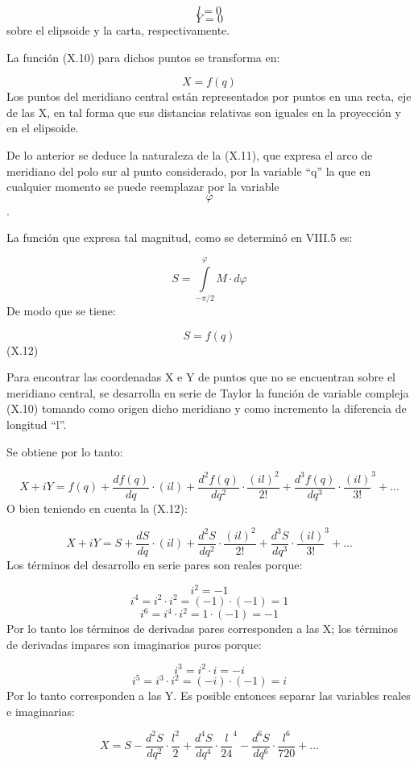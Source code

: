 \documentclass[]{article}
\begin{document}
\[l=0\] \[Y=0\] sobre el elipsoide y la carta, respectivamente.

La función (X.10) para dichos puntos se transforma en:

\[X=f\left(q\right)\] Los puntos del meridiano central están
representados por puntos en una recta, eje de las X, en tal forma que
sus distancias relativas son iguales en la proyección y en el elipsoide.

De lo anterior se deduce la naturaleza de la (X.11), que expresa el arco
de meridiano del polo sur al punto considerado, por la variable ``q'' la
que en cualquier momento se puede reemplazar por la variable
\[\varphi \].

La función que expresa tal magnitud, como se determinó en VIII.5 es:

\[S=\overset{{\varphi }}{\underset{{-\pi /2}}{\int }}{M\cdot
d\varphi }\] De modo que se tiene:

\[S=f\left(q\right)\] (X.12)

Para encontrar las coordenadas X e Y de puntos que no se encuentran
sobre el meridiano central, se desarrolla en serie de Taylor la función
de variable compleja (X.10) tomando como origen dicho meridiano y como
incremento la diferencia de longitud ``l''.

Se obtiene por lo tanto:

\[X+iY=f\left(q\right)+\frac{df\left(q\right)}{dq}\cdot
\left(il\right)+\frac{d^2f\left(q\right)}{dq^2}\cdot
{\frac{\left(il\right)^2}{2!}}+\frac{d^3f\left(q\right)}{dq^3}\cdot
{\frac{\left(il\right)}{3!}}^3+\text{.}\text{.}\text{.}\] O bien
teniendo en cuenta la (X.12):

\[X+iY=S+\frac{dS}{dq}\cdot
\left(il\right)+\frac{d^2S}{dq^2}\cdot
{\frac{\left(il\right)^2}{2!}}+\frac{d^3S}{dq^3}\cdot
{\frac{\left(il\right)}{3!}}^3+\text{.}\text{.}\text{.}\] Los términos
del desarrollo en serie pares son reales porque:

\[i^2=-1\] \[i^4=i^2\cdot i^2=\left(-1\right)\cdot \left(-1\right)=1\]
\[i^6=i^4\cdot i^2=1\cdot \left(-1\right)=-1\] Por lo tanto los términos
de derivadas pares corresponden a las X; los términos de derivadas
impares son imaginarios puros porque:

\[i^3=i^2\cdot i=-i\]
\[i^5=i^3\cdot i^2=\left(-i\right)\cdot \left(-1\right)=i\] Por lo tanto
corresponden a las Y. Es posible entonces separar las variables reales e
imaginarias:

\[X=S-\frac{d^2S}{dq^2}\cdot {\frac{l^2}{2}}+\frac{d^4S}{dq^4}\cdot {\frac{l}{\text{24}}}^4-\frac{d^6S}{dq^6}\cdot {\frac{l^6}{\text{720}}}+\text{.}\text{.}\text{.}\]
\end{document}
